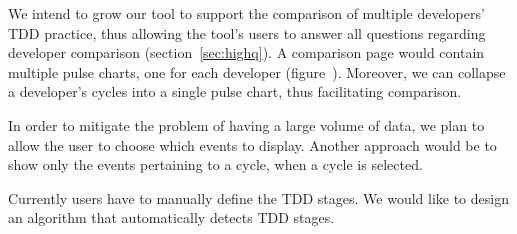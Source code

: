 \documentclass[journal]{vgtc}                %
\begin{document}
We intend to grow our tool to support the comparison of multiple developers' TDD practice, thus allowing the tool's users to answer all questions regarding developer comparison (section~\ref{sec:highq}).
A comparison page would contain multiple pulse charts, one for each developer (figure~).
Moreover, we can collapse a developer's cycles into a single pulse chart, thus facilitating comparison.


In order to mitigate the problem of having a large volume of data, we plan to allow the user to choose which events to display.
Another approach would be to show only the events pertaining to a cycle, when a cycle is selected.

Currently users have to manually define the TDD stages.
We would like to design an algorithm that automatically detects TDD stages.
 



\end{document}

